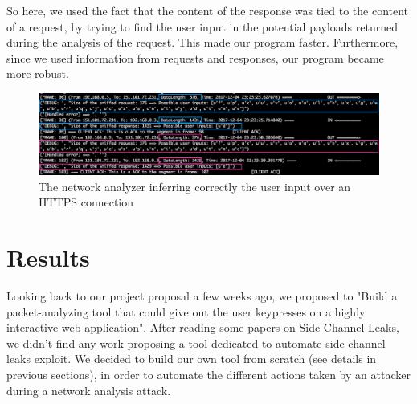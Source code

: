 \documentclass[journal]{IEEEtran}
\begin{document}
So here, we used the fact that the content of the response was tied to the content of a request, by trying to find the user input in the potential payloads returned during the analysis of the request. This made our program faster. Furthermore, since we used information from requests and responses, our program became more robust.



\begin{figure}[h]
\centering
\includegraphics[width=\textwidth]{images/sniffingInference.png}
\caption{The network analyzer inferring correctly the user input over an HTTPS connection}
\label{fig:sniffingInference}
\end{figure}

\section{Results}

Looking back to our project proposal a few weeks ago, we proposed to "Build a packet-analyzing tool that could give out the user keypresses on a highly interactive web application". After reading some papers on Side Channel Leaks, we didn't find any work proposing a tool dedicated to automate side channel leaks exploit. We decided to build our own tool from scratch (see details in previous sections), in order to automate the different actions taken by an attacker during a network analysis attack.

\medskip
\end{document}
